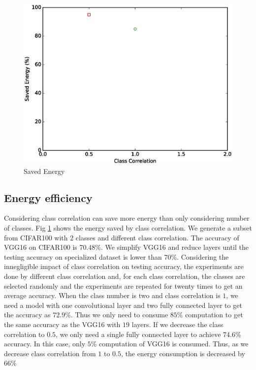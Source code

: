 \documentclass[pageno]{jpaper}
\begin{document}
\begin{figure}
\includegraphics[scale=0.43]{savedEnergy.ps}
\caption{Saved Energy}
\label{fig:savedEnergy}
\end{figure}


\subsection{Energy efficiency}
Considering class correlation can save more energy than only considering number of classes. Fig \ref{fig:savedEnergy} shows the energy saved by class correlation. We generate a subset from CIFAR100 with 2 classes and different class correlation. The accuracy of VGG16 on CIFAR100 is 70.48\%. We simplify VGG16 and reduce layers until the testing accuracy on specialized dataset is lower than 70\%. Considering the innegligible impact of class correlation on testing accuracy, the experiments are done by different class correlation and, for each class correlation, the classes are selected randomly and the experiments are repeated for twenty times to get an average accuracy. When the class number is two and class correlation is $1$, we need a model with one convolutional layer and two fully connected layer to get the accuracy as $72.9\%$. Thus we only need to consume $85\%$ computation to get the same accuracy as the VGG16 with $19$ layers. If we decrease the class correlation to $0.5$, we only need a single fully connected layer to achieve 74.6\% accuracy. In this case, only $5\%$ computation of VGG16 is consumed. Thus, as we decrease class correlation from $1$ to $0.5$, the energy consumption is decreased by $66\%$
\end{document}
